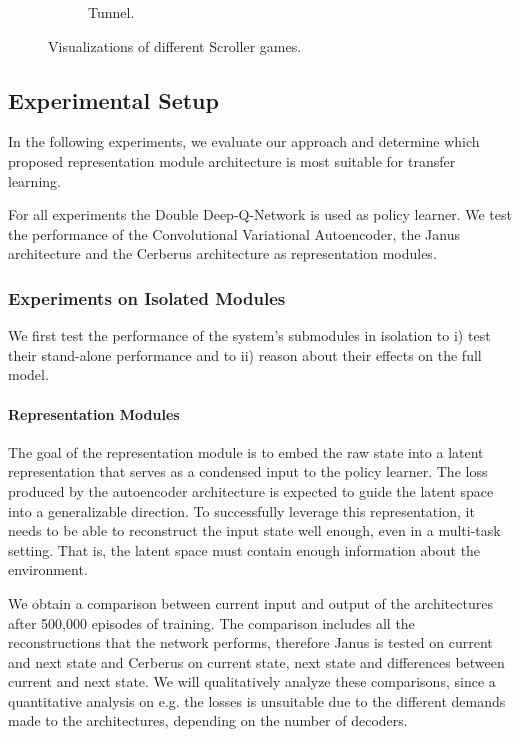\begin{figure}[ht!]
\begin{subfigure}{0.24\columnwidth}
		\caption{Tunnel.\\}
		\label{subfig:tunnel}
	\end{subfigure}
	\caption{Visualizations of different Scroller games.}
	\label{fig:scrollers}
\end{figure}

\subsection{Experimental Setup}
In the following experiments, we evaluate our approach and determine which proposed representation module architecture is most suitable for transfer learning.

For all experiments the Double Deep-Q-Network is used as policy learner. We test the performance of the Convolutional Variational Autoencoder, the Janus architecture and the Cerberus architecture as representation modules.

\subsubsection{Experiments on Isolated Modules}
We first test the performance of the system's submodules in isolation to i) test their stand-alone performance and to ii) reason about their effects on the full model.

\paragraph{Representation Modules}

The goal of the representation module is to embed the raw state into a latent representation that serves as a condensed input to the policy learner. The loss produced by the autoencoder architecture is expected to guide the latent space into a generalizable direction. To successfully leverage this representation, it needs to be able to reconstruct the input state well enough, even in a multi-task setting. That is, the latent space must contain enough information about the environment.

We obtain a comparison between current input and output of the architectures after 500,000 episodes of training. The comparison includes all the reconstructions that the network performs, therefore Janus is tested on current and next state and Cerberus on current state, next state and differences between current and next state. We will qualitatively analyze these comparisons, since a quantitative analysis on e.g. the losses is unsuitable due to the different demands made to the architectures, depending on the number of decoders. 

